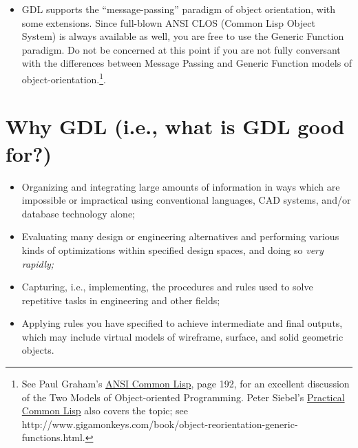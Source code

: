 \documentclass [11pt]{book}
\begin{document}
\begin{itemize}
\begin{itemize}
\end{itemize}


\item GDL supports the ``message-passing'' paradigm of object
orientation, with some extensions. Since full-blown ANSI CLOS (Common
Lisp Object System) is always available as well, you are free to use
the Generic Function paradigm. Do not be concerned at this point if
you are not fully conversant with the differences between Message
Passing and Generic Function models of object-orientation.\footnote{See Paul Graham's 
\underline{ANSI Common Lisp}, page 192, for an excellent discussion of the Two Models 
of Object-oriented Programming. Peter Siebel's 
\underline{Practical Common Lisp} also covers the topic; see http://www.gigamonkeys.com/book/object-reorientation-generic-functions.html.}.

\end{itemize}



\section{Why GDL (i.e., what is GDL good for?)}

\label{sec:whygdl(i.e.,whatisgdlgoodfor?)}



\begin{itemize}

\item Organizing and integrating large amounts of
information in ways which are impossible or impractical using
conventional languages, CAD systems, and/or database technology
alone;

\item Evaluating many design or engineering alternatives and 
performing various kinds of optimizations within specified design
spaces, and doing so \emph{very rapidly;}

\item Capturing, i.e., implementing, the procedures and rules used
to solve repetitive tasks in engineering and other fields;

\item Applying rules you have specified to achieve intermediate
and final outputs, which may include virtual models of wireframe,
surface, and solid geometric objects.

\end{itemize}
\end{document}
